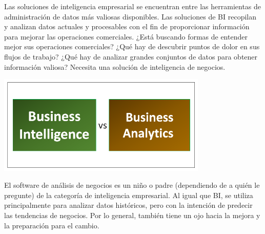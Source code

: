 Las soluciones de inteligencia empresarial se encuentran entre las herramientas de administración de datos más valiosas disponibles. Las soluciones de BI recopilan y analizan datos actuales y procesables con el fin de proporcionar información para mejorar las operaciones comerciales. ¿Está buscando formas de entender mejor sus operaciones comerciales? ¿Qué hay de descubrir puntos de dolor en sus flujos de trabajo? ¿Qué hay de analizar grandes conjuntos de datos para obtener información valiosa? Necesita una solución de inteligencia de negocios.
\begin{center}
\includegraphics[width=10cm]{./Imagenes/bivsba}
\end{center}
El software de análisis de negocios es un niño o padre (dependiendo de a quién le pregunte) de la categoría de inteligencia empresarial. Al igual que BI, se utiliza principalmente para analizar datos históricos, pero con la intención de predecir las tendencias de negocios. Por lo general, también tiene un ojo hacia la mejora y la preparación para el cambio. 

